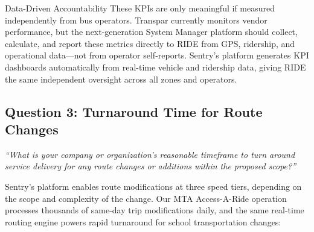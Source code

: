 \begin{sidebar}{Data-Driven Accountability}
These KPIs are only meaningful if measured independently from bus operators. Transpar currently monitors vendor performance, but the next-generation System Manager platform should collect, calculate, and report these metrics directly to RIDE from GPS, ridership, and operational data---not from operator self-reports. Sentry's platform generates KPI dashboards automatically from real-time vehicle and ridership data, giving RIDE the same independent oversight across all zones and operators.
\end{sidebar}

\subsection{Question 3: Turnaround Time for Route Changes}
\textit{``What is your company or organization's reasonable timeframe to turn around service delivery for any route changes or additions within the proposed scope?''}

\vspace{0.3cm}

Sentry's platform enables route modifications at three speed tiers, depending on the scope and complexity of the change. Our MTA Access-A-Ride operation processes thousands of same-day trip modifications daily, and the same real-time routing engine powers rapid turnaround for school transportation changes:

